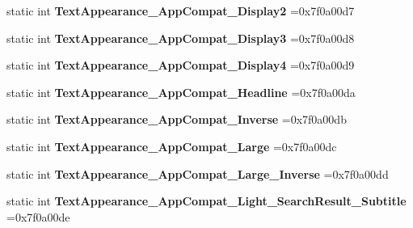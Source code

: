 \begin{DoxyCompactItemize}
\mbox{\label{classandroid_1_1support_1_1v4_1_1R_1_1style_ae82820313a7e13277a8d613406ed2968}} 
static int {\bfseries Text\+Appearance\+\_\+\+App\+Compat\+\_\+\+Display2} =0x7f0a00d7
\item 
\mbox{\label{classandroid_1_1support_1_1v4_1_1R_1_1style_a4ed818a19140501e7553484770c97f21}} 
static int {\bfseries Text\+Appearance\+\_\+\+App\+Compat\+\_\+\+Display3} =0x7f0a00d8
\item 
\mbox{\label{classandroid_1_1support_1_1v4_1_1R_1_1style_a8e5bbaf65f1ad24a3b43425850885b56}} 
static int {\bfseries Text\+Appearance\+\_\+\+App\+Compat\+\_\+\+Display4} =0x7f0a00d9
\item 
\mbox{\label{classandroid_1_1support_1_1v4_1_1R_1_1style_aecda9f58ef0f4f6ace46cefbc2018290}} 
static int {\bfseries Text\+Appearance\+\_\+\+App\+Compat\+\_\+\+Headline} =0x7f0a00da
\item 
\mbox{\label{classandroid_1_1support_1_1v4_1_1R_1_1style_a6f6135f50060236b03e913308b2593fc}} 
static int {\bfseries Text\+Appearance\+\_\+\+App\+Compat\+\_\+\+Inverse} =0x7f0a00db
\item 
\mbox{\label{classandroid_1_1support_1_1v4_1_1R_1_1style_a210a4ce3a36c140f5479ccd53e7f2f6e}} 
static int {\bfseries Text\+Appearance\+\_\+\+App\+Compat\+\_\+\+Large} =0x7f0a00dc
\item 
\mbox{\label{classandroid_1_1support_1_1v4_1_1R_1_1style_a98d5615353c7b94b82cd52596b6feeff}} 
static int {\bfseries Text\+Appearance\+\_\+\+App\+Compat\+\_\+\+Large\+\_\+\+Inverse} =0x7f0a00dd
\item 
\mbox{\label{classandroid_1_1support_1_1v4_1_1R_1_1style_a2eac5b931c6f3c90b860e6056efa5c55}} 
static int {\bfseries Text\+Appearance\+\_\+\+App\+Compat\+\_\+\+Light\+\_\+\+Search\+Result\+\_\+\+Subtitle} =0x7f0a00de
\item 
\mbox{\label{classandroid_1_1support_1_1v4_1_1R_1_1style_acefd3a28cb11727b0d95e17915977ba2}} 

\end{DoxyCompactItemize}
